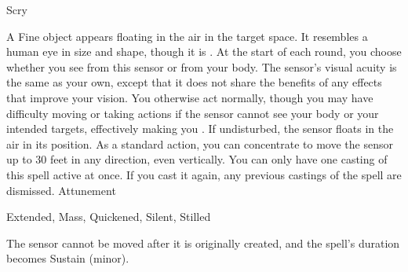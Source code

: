 \begin{spellsection}{Scry}
\begin{spellheader}
\end{spellheader}
\begin{spellcontent}
\begin{spelltargetinginfo}
\end{spelltargetinginfo}
\begin{spelleffects}
\spelleffect
A Fine object appears floating in the air in the target space.
It resembles a human eye in size and shape, though it is .
At the start of each round, you choose whether you see from this sensor or from your body.
The sensor's visual acuity is the same as your own, except that it does not share the benefits of any  effects that improve your vision.
You otherwise act normally, though you may have difficulty moving or taking actions if the sensor cannot see your body or your intended targets, effectively making you \blinded.
If undisturbed, the sensor floats in the air in its position.
As a standard action, you can concentrate to move the sensor up to 30 feet in any direction, even vertically.
You can only have one casting of this spell active at once.
If you cast it again, any previous castings of the spell are dismissed.
\spelldur Attunement
\end{spelleffects}
\end{spellcontent}
\begin{spellfooter}
 Extended, Mass, Quickened, Silent, Stilled
\end{spellfooter}
\begin{spellsubcontent}
\begin{spellcantrip}
The sensor cannot be moved after it is originally created, and the spell's duration becomes Sustain (minor).
\end{spellcantrip}
\end{spellsubcontent}
\end{spellsection}
